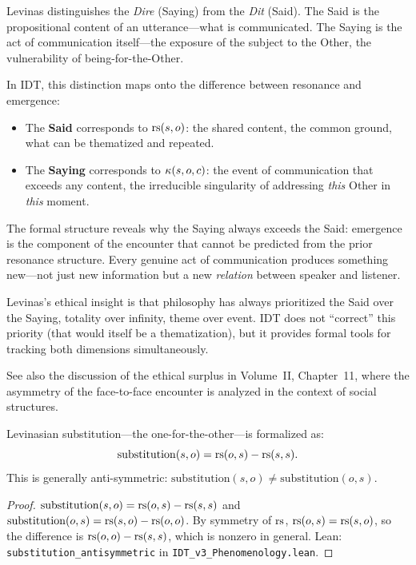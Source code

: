 \begin{interpretation}
\label{interp:levinas-saying-said}
Levinas distinguishes the \textit{Dire} (Saying) from the \textit{Dit} (Said).
The Said is the propositional content of an utterance---what is communicated.
The Saying is the act of communication itself---the exposure of the subject to
the Other, the vulnerability of being-for-the-Other.

In IDT, this distinction maps onto the difference between resonance and emergence:
\begin{itemize}
\item The \textbf{Said} corresponds to $\mathrm{rs}(s, o)$: the shared content, the
common ground, what can be thematized and repeated.
\item The \textbf{Saying} corresponds to $\kappa(s, o, c)$: the event of
communication that exceeds any content, the irreducible singularity of
addressing \emph{this} Other in \emph{this} moment.
\end{itemize}

The formal structure reveals why the Saying always exceeds the Said: emergence
is the component of the encounter that cannot be predicted from the prior
resonance structure.  Every genuine act of communication produces something
new---not just new information but a new \emph{relation} between speaker and
listener.

Levinas's ethical insight is that philosophy has always prioritized the Said
over the Saying, totality over infinity, theme over event.  IDT does not
``correct'' this priority (that would itself be a thematization), but it
provides formal tools for tracking both dimensions simultaneously.

See also the discussion of the ethical surplus in Volume~II, Chapter~11,
where the asymmetry of the face-to-face encounter is analyzed in the context
of social structures.
\end{interpretation}

\begin{theorem}
\label{thm:substitution-antisymmetric}
Levinasian substitution---the one-for-the-other---is formalized as:
\[
\mathrm{substitution}(s, o) = \mathrm{rs}(o, s) - \mathrm{rs}(s, s).
\]
This is generally anti-symmetric: $\mathrm{substitution}(s, o) \neq \mathrm{substitution}(o, s)$.
\end{theorem}

\begin{proof}
$\mathrm{substitution}(s, o) = \mathrm{rs}(o, s) - \mathrm{rs}(s, s)$ and
$\mathrm{substitution}(o, s) = \mathrm{rs}(s, o) - \mathrm{rs}(o, o)$.
By symmetry of $\mathrm{rs}$, $\mathrm{rs}(o, s) = \mathrm{rs}(s, o)$, so the difference is
$\mathrm{rs}(o, o) - \mathrm{rs}(s, s)$, which is nonzero in general.
Lean: \texttt{substitution\_antisymmetric} in \texttt{IDT\_v3\_Phenomenology.lean}.
\end{proof}

